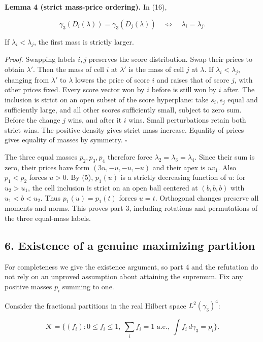 \documentclass[
  11pt,
]{article}
\begin{document}
\textbf{Lemma 4 (strict mass-price ordering).} In (16),

\[
 \gamma_3(D_i(\lambda))=\gamma_3(D_j(\lambda))
           \quad\Longleftrightarrow\quad\lambda_i=\lambda_j.
                                                                  \tag{17}
\]

If \(\lambda_i<\lambda_j\), the first mass is strictly larger.

\emph{Proof.} Swapping labels \(i,j\) preserves the score distribution.
Swap their prices to obtain \(\lambda'\). Then the mass of cell \(i\) at
\(\lambda'\) is the mass of cell \(j\) at \(\lambda\). If
\(\lambda_i<\lambda_j\), changing from \(\lambda'\) to \(\lambda\)
lowers the price of score \(i\) and raises that of score \(j\), with
other prices fixed. Every score vector won by \(i\) before is still won
by \(i\) after. The inclusion is strict on an open subset of the score
hyperplane: take \(s_i,s_j\) equal and sufficiently large, and all other
scores sufficiently small, subject to zero sum. Before the change \(j\)
wins, and after it \(i\) wins. Small perturbations retain both strict
wins. The positive density gives strict mass increase. Equality of
prices gives equality of masses by symmetry. \(\square\)

The three equal masses \(p_2,p_3,p_4\) therefore force
\(\lambda_2=\lambda_3=\lambda_4\). Since their sum is zero, their prices
have form \((3u,-u,-u,-u)\) and their apex is \(u v_1\). Also
\(p_1<p_2\) forces \(u>0\). By (5), \(p_1(u)\) is a strictly decreasing
function of \(u\): for \(u_2>u_1\), the cell inclusion is strict on an
open ball centered at \((b,b,b)\) with \(u_1<b<u_2\). Thus
\(p_1(u)=p_1(t)\) forces \(u=t\). Orthogonal changes preserve all
moments and norms. This proves part 3, including rotations and
permutations of the three equal-mass labels.

\subsection{6. Existence of a genuine maximizing
partition}\label{existence-of-a-genuine-maximizing-partition}

For completeness we give the existence argument, so part 4 and the
refutation do not rely on an unproved assumption about attaining the
supremum. Fix any positive masses \(p_i\) summing to one.

Consider the fractional partitions in the real Hilbert space
\(L^2(\gamma_3)^4\):

\[
 \mathcal K=\{(f_i):0\le f_i\le1,\ \sum_i f_i=1
                \text{ a.e.},\ \int f_i\,d\gamma_3=p_i\}. \tag{18}
\]
\end{document}

